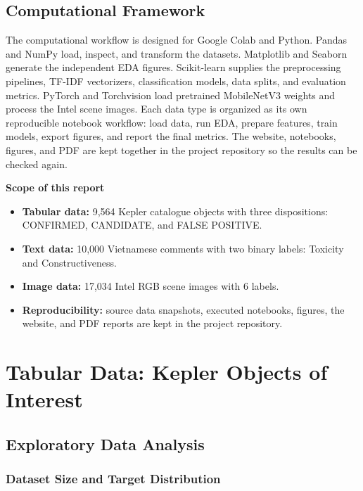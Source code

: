 \documentclass[oneside]{hcmut-report}
\begin{document}
\subsection*{Computational Framework}

The computational workflow is designed for Google Colab and Python. Pandas and NumPy load, inspect, and transform the datasets. Matplotlib and Seaborn generate the independent EDA figures. Scikit-learn supplies the preprocessing pipelines, TF-IDF vectorizers, classification models, data splits, and evaluation metrics. PyTorch and Torchvision load pretrained MobileNetV3 weights and process the Intel scene images. Each data type is organized as its own reproducible notebook workflow: load data, run EDA, prepare features, train models, export figures, and report the final metrics. The website, notebooks, figures, and PDF are kept together in the project repository so the results can be checked again.

\begin{importantbox}
\textbf{Scope of this report}
\begin{itemize}[leftmargin=5mm]
  \item \textbf{Tabular data:} 9,564 Kepler catalogue objects with three dispositions: CONFIRMED, CANDIDATE, and FALSE POSITIVE.
  \item \textbf{Text data:} 10,000 Vietnamese comments with two binary labels: Toxicity and Constructiveness.
  \item \textbf{Image data:} 17,034 Intel RGB scene images with 6 labels.
  \item \textbf{Reproducibility:} source data snapshots, executed notebooks, figures, the website, and PDF reports are kept in the project repository.
\end{itemize}
\end{importantbox}

\clearpage
\section{Tabular Data: Kepler Objects of Interest}
\label{sec:tabular}

\subsection{Exploratory Data Analysis}

\subsubsection{Dataset Size and Target Distribution}
\end{document}
